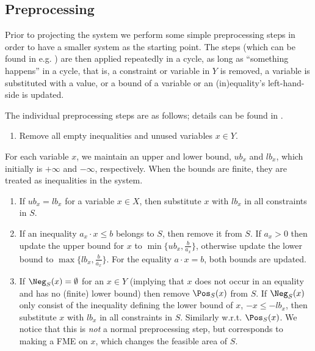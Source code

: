 \subsection{Preprocessing}
Prior to projecting the system we perform some simple preprocessing steps in order to have a smaller system as the starting point. The steps (which can be found in e.g. \cite{brearley75,andersen95,maros})
are then applied repeatedly in a cycle, as long as ``something happens'' in a cycle, that is, a constraint or variable in $Y$ is removed, a variable is substituted with a value, or a bound of a variable or an (in)equality's left-hand-side is updated.

The individual preprocessing steps are as follows; details can be found in \cite{MyTechRep}.
%
\begin{enumerate} \itemsep0em
	\item Remove all empty inequalities and unused variables $x\in Y$.
\setcounter{counterName}{\value{enumi}}
\end{enumerate}
For each variable $x$, we maintain an upper and lower bound, $ub_x$ and $lb_x$, which initially is $+\infty$ and $-\infty$, respectively. When the bounds are finite, they are treated as inequalities in the system.
\begin{enumerate} \itemsep0em
\setcounter{enumi}{\value{counterName}}
	\item If $ub_x = lb_x$ for a variable $x\in X$, then substitute $x$ with $lb_x$ in all constraints in $S$. 
	\item If an inequality $a_x\cdot x \leq b$ belongs to $S$, then remove it from $S$. If $a_x>0$ then update the upper bound for $x$ to $\min\{ub_x,\frac{b}{a_x}\}$, otherwise update the lower bound to $\max\{lb_x,\frac{b}{a_x}\}$.
For the equality $a\cdot x = b$, both bounds are updated.
	\item If $\Neg_S(x)=\emptyset$ for an $x\in Y$ (implying that $x$ does not occur in an equality and has no (finite) lower bound) then remove $\Pos_S(x)$ from $S$. If $\Neg_S(x)$ only consist of the inequality defining the lower bound of $x$, $-x\leq -lb_x$, then substitute $x$ with $lb_x$ in all constraints in $S$. Similarly w.r.t. $\Pos_S(x)$. We notice that this is \emph{not} a normal preprocessing step, but corresponds to making a FME on $x$, which changes the feasible area of $S$. 
\setcounter{counterName}{\value{enumi}}
\end{enumerate}
